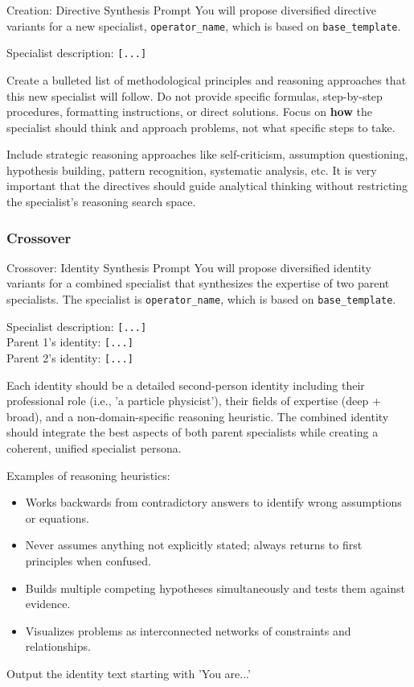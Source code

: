 \documentclass{article} %
\begin{document}
\begin{promptbox}{Creation: Directive Synthesis Prompt}
You will propose diversified directive variants for a new specialist, \texttt{{operator\_name}}, which is based on \texttt{{base\_template}}.

\medskip\noindent
Specialist description: \texttt{[...]}
\medskip

Create a bulleted list of methodological principles and reasoning approaches that this new specialist will follow. Do not provide specific formulas, step-by-step procedures, formatting instructions, or direct solutions. Focus on \textbf{how} the specialist should think and approach problems, not what specific steps to take. 

\medskip

Include strategic reasoning approaches like self-criticism, assumption questioning, hypothesis building, pattern recognition, systematic analysis, etc. It is very important that the directives should guide analytical thinking without restricting the specialist's reasoning search space.
\end{promptbox}

\subsubsection{Crossover}

\begin{promptbox}{Crossover: Identity Synthesis Prompt}
You will propose diversified identity variants for a combined specialist that synthesizes the expertise of two parent specialists. The specialist is \texttt{{operator\_name}}, which is based on \texttt{{base\_template}}.

\medskip\noindent
Specialist description: \texttt{[...]} \\
Parent 1's identity: \texttt{[...]} \\
Parent 2's identity: \texttt{[...]}
\medskip

Each identity should be a detailed second-person identity including their professional role (i.e., 'a particle physicist'), their fields of expertise (deep + broad), and a non-domain-specific reasoning heuristic. The combined identity should integrate the best aspects of both parent specialists while creating a coherent, unified specialist persona.

\medskip\noindent
Examples of reasoning heuristics:
\begin{itemize}[leftmargin=*, topsep=2pt, itemsep=0pt]
    \item Works backwards from contradictory answers to identify wrong assumptions or equations.
    \item Never assumes anything not explicitly stated; always returns to first principles when confused.
    \item Builds multiple competing hypotheses simultaneously and tests them against evidence.
    \item Visualizes problems as interconnected networks of constraints and relationships.
\end{itemize}
\medskip

Output the identity text starting with 'You are...'
\end{promptbox}
\end{document}
